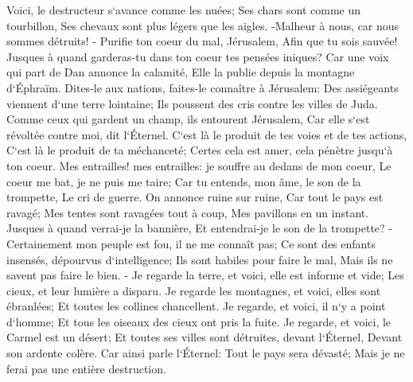 \verse Voici, le destructeur s`avance comme les nuées; Ses chars sont comme un tourbillon, Ses chevaux sont plus légers que les aigles. -Malheur à nous, car nous sommes détruits! - 
\verse Purifie ton coeur du mal, Jérusalem, Afin que tu sois sauvée! Jusques à quand garderas-tu dans ton coeur tes pensées iniques? 
\verse Car une voix qui part de Dan annonce la calamité, Elle la publie depuis la montagne d`Éphraïm. 
\verse Dites-le aux nations, faites-le connaître à Jérusalem: Des assiégeants viennent d`une terre lointaine; Ils poussent des cris contre les villes de Juda. 
\verse Comme ceux qui gardent un champ, ils entourent Jérusalem, Car elle s`est révoltée contre moi, dit l`Éternel. 
\verse C`est là le produit de tes voies et de tes actions, C`est là le produit de ta méchanceté; Certes cela est amer, cela pénètre jusqu`à ton coeur. 
\verse Mes entrailles! mes entrailles: je souffre au dedans de mon coeur, Le coeur me bat, je ne puis me taire; Car tu entends, mon âme, le son de la trompette, Le cri de guerre. 
\verse On annonce ruine sur ruine, Car tout le pays est ravagé; Mes tentes sont ravagées tout à coup, Mes pavillons en un instant. 
\verse Jusques à quand verrai-je la bannière, Et entendrai-je le son de la trompette? - 
\verse Certainement mon peuple est fou, il ne me connaît pas; Ce sont des enfants insensés, dépourvus d`intelligence; Ils sont habiles pour faire le mal, Mais ils ne savent pas faire le bien. - 
\verse Je regarde la terre, et voici, elle est informe et vide; Les cieux, et leur lumière a disparu. 
\verse Je regarde les montagnes, et voici, elles sont ébranlées; Et toutes les collines chancellent. 
\verse Je regarde, et voici, il n`y a point d`homme; Et tous les oiseaux des cieux ont pris la fuite. 
\verse Je regarde, et voici, le Carmel est un désert; Et toutes ses villes sont détruites, devant l`Éternel, Devant son ardente colère. 
\verse Car ainsi parle l`Éternel: Tout le pays sera dévasté; Mais je ne ferai pas une entière destruction. 
